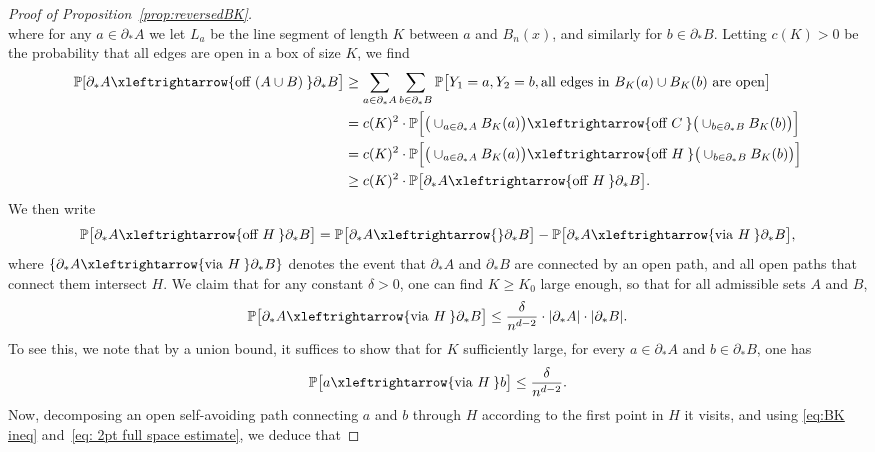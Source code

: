 \documentclass[11pt,a4paper]{article}
\numberwithin{equation}{section}
\theoremstyle{plain}
\theoremstyle{definition}
\newcommand{\connect}{\xleftrightarrow}
\begin{document}
\begin{proof}[Proof of Proposition~\textup{\ref{prop:reversedBK}}]
\begin{equation}
\end{equation}
where for any $a\in \partial_*A$ we let $L_a$ be the line segment of length $K$ between $a$ and $B_n(x)$, and similarly for $b\in \partial_*B$. Letting $c(K)>0$ be the probability that all edges are open in a box of size $K$, we find  
\begin{align}
\begin{split}
 \mathbb P[\partial_*A\connect{\textrm{off } (A\cup B)\:}\partial_*B\big]& \ge \sum_{a\in \partial_*A}\sum_{b\in \partial_*B} \mathbb P\big[Y_1 = a, Y_2= b, \textrm{all edges in }B_K(a)\cup B_K(b) \textrm{ are open}\big] \\
 &  =  c(K)^2 \cdot \mathbb P \Big[ \big(\cup_{a\in \partial_*A} B_K(a)\big) \connect{\textrm{off } C\:}\big(\cup_{b\in \partial_*B} B_K(b)\big)\Big]\\
 & = c(K)^2 \cdot \mathbb P \Big[ \big(\cup_{a\in \partial_*A} B_K(a)\big) \connect{\textrm{off } H\:}\big(\cup_{b\in \partial_*B} B_K(b)\big)\Big]\\
 & \ge c(K)^2 \cdot \mathbb P \big[  \partial_*A  \connect{\textrm{off } H\:}\partial_*B\big].
 \end{split} 
 \end{align}
We then write 
\begin{equation}
\mathbb P\big[  \partial_*A  \connect{\textrm{off } H\:}\partial_*B\big] = 
\mathbb P\big[  \partial_*A  \connect{} \partial_*B\big] - \mathbb P\big[  \partial_*A  \connect{\textrm{via } H\:}\partial_*B\big], 
\end{equation}
where $\{\partial_*A  \connect{\textrm{via } H\:}\partial_*B\}$ denotes the event that $\partial_*A$ and  $\partial_*B$ are connected by an open path, and all open paths that connect them intersect $H$.  We claim that for any constant $\delta>0$, one can find $K\geq K_0$ large enough, so that for all admissible sets $A$ and $B$, 
\begin{equation} \label{connect.viaH}
\mathbb P\big[  \partial_*A  \connect{\textrm{via } H\:}\partial_*B\big] \le \frac{\delta}{n^{d-2}} \cdot |\partial_*A| \cdot |\partial_*B|. 
\end{equation} 
To see this, we note that by a union bound, it suffices to show that for $K$ sufficiently large, for every $a\in \partial_*A$ and $b\in \partial_*B$, one has\begin{equation} \label{connect.viaH2}
\mathbb P\big[ a \connect{\textrm{via } H\:} b\big] \le \frac{\delta}{n^{d-2}}. 
\end{equation} 
Now, decomposing an open self-avoiding path connecting $a$ and $b$ through $H$ according to the first point in $H$ it visits, and using \eqref{eq:BK ineq} and~\eqref{eq: 2pt full space estimate}, we deduce that  

\end{proof}
\end{document}
